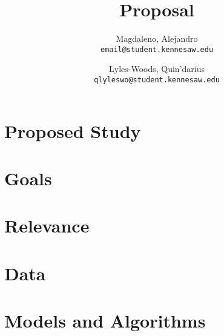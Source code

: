 \documentclass{report}
\title{Proposal}
\author{
	Magdaleno, Alejandro\\
	\texttt{email@student.kennesaw.edu}
	\and
	Lyles-Woods, Quin'darius \\
	\texttt{qlyleswo@student.kennesaw.edu}
}
\begin{document}
\maketitle
\section*{Proposed Study}
\section{Goals}
\section{Relevance}
\section{Data}
\section{Models and Algorithms}
\end{document}
